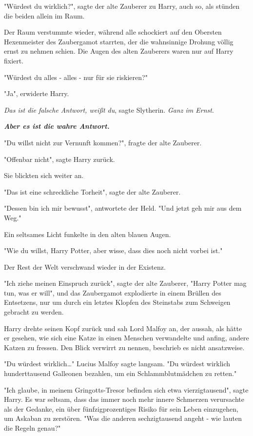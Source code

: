 {"Würdest du wirklich?", sagte der alte Zauberer zu Harry, auch so, als stünden die beiden allein im Raum.

Der Raum verstummte wieder, während alle schockiert auf den Obersten Hexenmeister des Zaubergamot starrten, der die wahnsinnige Drohung völlig ernst zu nehmen schien. Die Augen des alten Zauberers waren nur auf Harry fixiert.

"Würdest du alles - alles - nur für sie riskieren?"

"Ja", erwiderte Harry.

\emph{Das ist die falsche Antwort, weißt du}, sagte Slytherin. \emph{Ganz im Ernst}.

\textbf{\emph{Aber es ist die wahre Antwort.}}

"Du willst nicht zur Vernunft kommen?", fragte der alte Zauberer.

"Offenbar nicht", sagte Harry zurück.

Sie blickten sich weiter an.

"Das ist eine schreckliche Torheit", sagte der alte Zauberer.

"Dessen bin ich mir bewusst", antwortete der Held. "Und jetzt geh mir aus dem Weg."

Ein seltsames Licht funkelte in den alten blauen Augen.

"Wie du willst, Harry Potter, aber wisse, dass dies noch nicht vorbei ist."

Der Rest der Welt verschwand wieder in der Existenz.

"Ich ziehe meinen Einspruch zurück", sagte der alte Zauberer, "Harry Potter mag tun, was er will", und das Zaubergamot explodierte in einem Brüllen des Entsetzens, nur um durch ein letztes Klopfen des Steinstabs zum Schweigen gebracht zu werden.

Harry drehte seinen Kopf zurück und sah Lord Malfoy an, der aussah, als hätte er gesehen, wie sich eine Katze in einen Menschen verwandelte und anfing, andere Katzen zu fressen. Den Blick verwirrt zu nennen, beschrieb es nicht ansatzweise.

"Du würdest wirklich…" Lucius Malfoy sagte langsam. "Du würdest wirklich hunderttausend Galleonen bezahlen, um ein Schlammblutmädchen zu retten."

"Ich glaube, in meinem Gringotts-Tresor befinden sich etwa vierzigtausend", sagte Harry. Es war seltsam, dass das immer noch mehr innere Schmerzen verursachte als der Gedanke, ein über fünfzigprozentiges Risiko für sein Leben einzugehen, um Askaban zu zerstören. "Was die anderen sechzigtausend angeht - wie lauten die Regeln genau?"

}
